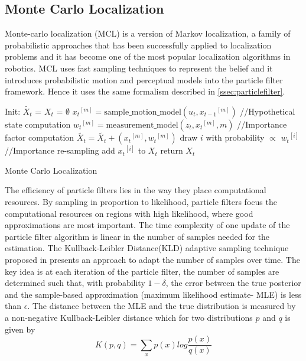 {\subsection{Monte Carlo Localization}
\label{ssec:montecarlo}
	Monte-carlo localization (MCL)\cite{fox1999monte} is a version of Markov localization, a family of probabilistic approaches that has been successfully applied to localization problems and it has become one of the most popular localization algorithms in robotics. MCL uses fast sampling techniques to represent the belief and it introduces probabilistic motion and perceptual models into the particle filter framework. Hence it uses the same formalism described in \ref{ssec:particlefilter}.\\  	
\begin{algorithm}
Init: {$\tilde{X_t}$ = $X_t$ = $\emptyset$ } \;
  { 
   ${x_t}^{[m]} = \text{sample\_motion\_model}(u_t,{x_{t-1}}^{[m]})$ //Hypothetical state computation\;
   ${w_t}^{[m]} = \text{measurement\_model}(z_t,{x_t}^{[m]},m)$ //Importance factor computation \; 
   $\tilde{X_t} = \tilde{X_t} + ({x_t}^{[m]},{w_t}^{[m]})$ \;
 }
  { 
   draw $i$ with probability $\varpropto$ ${w_t}^{[i]}$ //Importance re-sampling\;
   add ${x_t}^{[i]}$ to $X_t$ \;
 }
 return $X_t$
 \caption{Monte Carlo Localization}
 \label{alg:montecarlo}
\end{algorithm}

	The efficiency of particle filters lies in the way they place computational resources. By sampling in proportion to likelihood, particle filters focus the computational resources on regions with high likelihood, where good approximations are most important. The time complexity of one update of the particle filter algorithm is linear in the number of samples needed for the estimation. The Kullback-Leibler Distance(KLD) adaptive sampling technique proposed in \cite{fox2003adapting} presents an approach to adapt the number of samples over time. The key idea is at each iteration of the particle filter, the number of samples are determined such that, with probability $1-\delta$, the error between the true posterior and the sample-based approximation (maximum likelihood estimate- MLE) is less than $\epsilon$. The distance between the MLE and the true distribution is measured by a non-negative Kullback-Leibler distance which for two distributions $p$ and $q$ is given by
\begin{equation}
K(p,q) = \sum_{x} p(x)log{\frac{p(x)}{q(x)}}
\end{equation}

}
